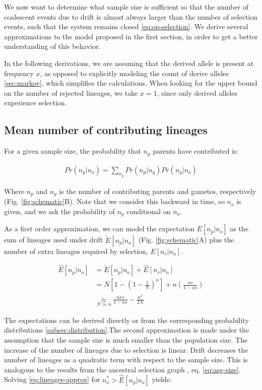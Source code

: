 \documentclass[review]{elsarticle}
\begin{document}
We now want to determine what sample size is sufficient so that the number of coalescent events due
to drift is almost always larger than the number of selection events, such that the system remains
closed \eqref{eq:op-selection}. We derive several approximations to the model proposed in the first
section, in order to get a better understanding of this behavior.

In the following derivations, we are assuming that the derived allele is present at frequency $x$,
as opposed to explicitly modeling the count of derive alleles \ref{sec:markov}, which simplifies the
calculations. When looking for the upper bound on the number of rejected lineages, we take $x=1$,
since only derived alleles experience selection.

\subsection{Mean number of contributing lineages}
\label{sec:mean-contr}

For a given sample size, the probability that $n_p$ parents have contributed is:

\begin{align}
  \label{eq:conditional}
  Pr(n_p | n_o) = \sum_{n_g} Pr(n_p | n_g)Pr(n_g | n_o)
\end{align}

Where $n_p$ and $n_g$ is the number of contributing parents and gametes, respectively (Fig.
\ref{fig:schematic}B). Note that we consider this backward in time, so $n_o$ is given, and we ask
the probability of $n_p$ conditional on $n_o$.

As a first order approximation, we can model the expectation $E[n_p | n_o]$ as the sum of lineages
used under drift $\tilde{E}[n_p | n_o]$ (Fig. \ref{fig:schematic}A) plus the number of extra
lineages required by selection, $E[n_r | n_o]$.

\begin{equation*}
  \begin{aligned}
    \label{eq:lineages-approx}
    \hat{E}[n_p  | n_o] &= \tilde{E}[n_p | n_o] + \hat{E}[n_r | n_o] \\
    &= N\left[1-\left( 1 - \frac{1}{N} \right)^n \right] + n\left( \frac{xs}{1-xs}\right) \\
    &\underset{N\gg n}{\approx} \frac{nxs}{1-xs} - \frac{n^2}{2N}
  \end{aligned}
\end{equation*}

The expectations can be derived directly or from the corresponding probability distributions
\ref{subsec:distribution}.The second approximation is made under the assumption that the sample size
is much smaller than the population size. The increase of the number of lineages due to selection is
linear. Drift decreases the number of lineages as a quadratic term with respect to the sample size.
This is analogous to the results from the ancestral selection graph \citep{KroneNeuhauser1997}, eq.
\eqref{eq:asg-size}. Solving \eqref{eq:lineages-approx} for $n_o^* > \hat{E}[n_p | n_o]$ yields:
\end{document}
